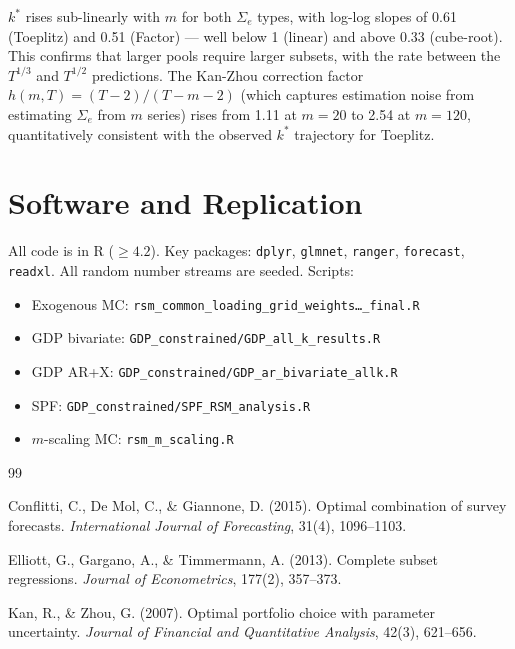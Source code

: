 \documentclass[12pt,a4paper]{article}
\begin{document}
\noindent
$k^*$ rises sub-linearly with $m$ for both $\Sigma_e$ types, with
log-log slopes of 0.61 (Toeplitz) and 0.51 (Factor) --- well below 1
(linear) and above 0.33 (cube-root). This confirms that larger pools
require larger subsets, with the rate between the $T^{1/3}$ and
$T^{1/2}$ predictions. The Kan-Zhou correction factor
$h(m,T)=(T-2)/(T-m-2)$ (which captures estimation noise from estimating
$\Sigma_e$ from $m$ series) rises from 1.11 at $m=20$ to 2.54 at $m=120$,
quantitatively consistent with the observed $k^*$ trajectory for Toeplitz.

\section{Software and Replication}
All code is in R ($\geq 4.2$). Key packages: \texttt{dplyr}, \texttt{glmnet},
\texttt{ranger}, \texttt{forecast}, \texttt{readxl}. All random number streams
are seeded. Scripts:
\begin{itemize}
\item Exogenous MC: \texttt{rsm\_common\_loading\_grid\_weights\ldots\_final.R}
\item GDP bivariate: \texttt{GDP\_constrained/GDP\_all\_k\_results.R}
\item GDP AR+X: \texttt{GDP\_constrained/GDP\_ar\_bivariate\_allk.R}
\item SPF: \texttt{GDP\_constrained/SPF\_RSM\_analysis.R}
\item $m$-scaling MC: \texttt{rsm\_m\_scaling.R}
\end{itemize}

\begin{thebibliography}{99}

Conflitti, C., De Mol, C., \& Giannone, D. (2015).
Optimal combination of survey forecasts.
\textit{International Journal of Forecasting}, 31(4), 1096--1103.

Elliott, G., Gargano, A., \& Timmermann, A. (2013).
Complete subset regressions.
\textit{Journal of Econometrics}, 177(2), 357--373.

Kan, R., \& Zhou, G. (2007).
Optimal portfolio choice with parameter uncertainty.
\textit{Journal of Financial and Quantitative Analysis}, 42(3), 621--656.

\end{thebibliography}
\end{document}
